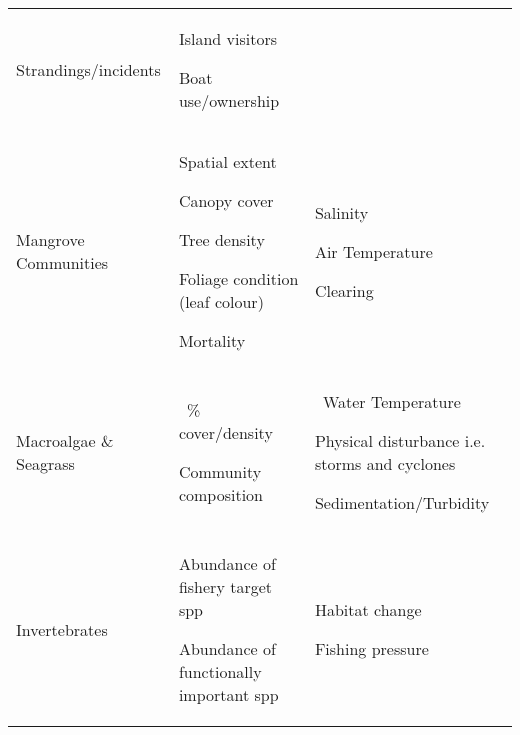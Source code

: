 \documentclass[version=last,
    paper=a4,                               %
    10pt,                                   %
    dvipsnames,
    oneside,                              %
    headings=openany,                       %
    open=any,
    BCOR=7mm,                               %
    DIV=15,     %
]{scrbook}
\begin{document}
\begin{longtable}[]{@{}lll@{}}
\begin{minipage}[t]{0.30\columnwidth}
Strandings/incidents\strut
\end{minipage} & \begin{minipage}[t]{0.30\columnwidth}\raggedright
Island visitors

Boat use/ownership\strut
\end{minipage}\tabularnewline
\begin{minipage}[t]{0.30\columnwidth}\raggedright
Mangrove Communities\strut
\end{minipage} & \begin{minipage}[t]{0.30\columnwidth}\raggedright
Spatial extent

Canopy cover

Tree density

Foliage condition (leaf colour)

Mortality\strut
\end{minipage} & \begin{minipage}[t]{0.30\columnwidth}\raggedright
Salinity

Air Temperature

Clearing\strut
\end{minipage}\tabularnewline
\begin{minipage}[t]{0.30\columnwidth}\raggedright
Macroalgae \& Seagrass\strut
\end{minipage} & \begin{minipage}[t]{0.30\columnwidth}\raggedright
~\% cover/density

Community composition\strut
\end{minipage} & \begin{minipage}[t]{0.30\columnwidth}\raggedright
~Water Temperature

Physical disturbance i.e. storms and cyclones

Sedimentation/Turbidity\strut
\end{minipage}\tabularnewline
\begin{minipage}[t]{0.30\columnwidth}\raggedright
Invertebrates\strut
\end{minipage} & \begin{minipage}[t]{0.30\columnwidth}\raggedright
Abundance of fishery target spp

Abundance of functionally important spp\strut
\end{minipage} & \begin{minipage}[t]{0.30\columnwidth}\raggedright
Habitat change

Fishing pressure\strut
\end{minipage}\tabularnewline
\bottomrule
\end{longtable}
\end{document}
